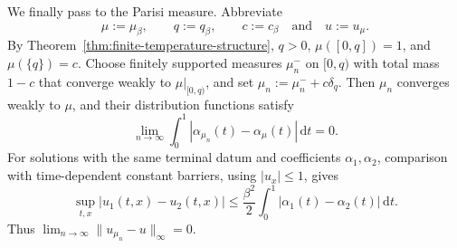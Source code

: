 \documentclass[10pt]{amsart}
\theoremstyle{definition}
\theoremstyle{remark}
\numberwithin{equation}{section}
\newcommand{\1}{\mathbf 1}
\newcommand{\dd}{\,\mathrm d}
\begin{document}
We finally pass to the Parisi measure.  Abbreviate
\begin{equation*}
 \mu:=\mu_\beta,\qquad q:=q_\beta,\qquad c:=c_\beta
 \quad\text{and}\quad u:=u_\mu.
\end{equation*}
By Theorem~\ref{thm:finite-temperature-structure}, $q>0$, $\mu([0,q])=1$, and $\mu(\{q\})=c$.  Choose finitely supported measures $\mu_n^-$ on $[0,q)$ with total mass $1-c$ that converge weakly to $\mu|_{[0,q)}$, and set $\mu_n:=\mu_n^-+c\delta_q$. Then $\mu_n$ converges weakly to $\mu$, and their distribution functions satisfy
\begin{equation}
 \lim_{n\to\infty}\int_0^1|\alpha_{\mu_n}(t)
 -\alpha_\mu(t)|\dd t=0.
 \label{eq:app-ft-alpha-approximation}
\end{equation}
For solutions with the same terminal datum and coefficients $\alpha_1,\alpha_2$, comparison with time-dependent constant barriers, using $|u_x|\leq1$, gives
\begin{equation}
 \sup_{t,x}|u_1(t,x)-u_2(t,x)|
 \leq\frac{\beta^2}{2}
 \int_0^1|\alpha_1(t)-\alpha_2(t)|\dd t.
 \label{eq:app-ft-PDE-stability}
\end{equation}
Thus $\lim_{n\to\infty}\|u_{\mu_n}-u\|_\infty=0$.
\end{document}
